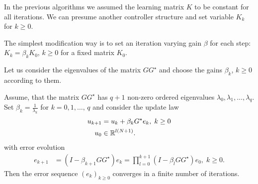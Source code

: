 In the previous algorithms we assumed the learning matrix $K$ to be constant for all iterations.
We can presume another controller structure and set variable $K_k$ for $k\geq 0$. 

The simplest modification way is to set an iteration varying gain $\beta$ for each step: $K_k = \beta_k K_0$, $k\geq 0$ for a fixed matrix $K_0$. 

Let us consider the eigenvalues of the matrix $GG^\star$ and choose the gains $\beta_k$, $k \geq 0$ according to them. 

\begin{theo}
	Assume, that the matrix $GG^\star$ has $q+1$ non-zero ordered eigenvalues $\lambda_0, \lambda_1, \dots ,  \lambda_q$. Set $\beta_k = \frac{1}{\lambda_k}$ for $k = 0, 1, \dots, \, q$ and consider the update law
	\begin{align}
	\label{eq:cl_var0}
	\begin{split}
	u_{k+1} &= u_k + \beta_k G^\star e_k, \; k \geq 0\\
	u_0 &\in {\mathbb{R}}^{l (N+1)}.
	\end{split}
	\end{align}
	with error evolution 
	\begin{align}
	e _{k+1} &= (I - \beta_{k+1}  GG^\star) e_{k}  = \prod_{l = 0}^{k+1} (I - \beta_{l}  GG^\star) e_0, \; k\geq 0. 
	\end{align}
	Then the error sequence $(e_k)_{k\geq 0}$ converges in a finite number of iterations.     
\end{theo}
